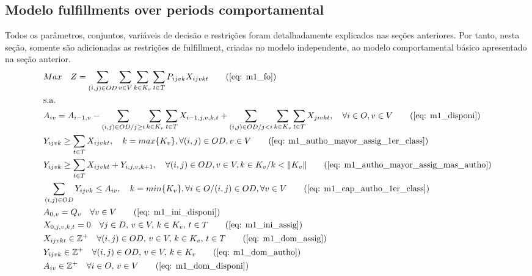\subsection{Modelo fulfillments over periods comportamental}
Todos os parâmetros, conjuntos, variáveis de decisão e restrições foram detalhadamente explicados nas seções anteriores. Por tanto, nesta seção, somente são adicionadas as restrições de fulfillment, criadas no modelo independente, ao modelo comportamental básico apresentado na seção anterior.
\allowdisplaybreaks
\begin{align}
	& Max \quad Z = \sum_{(i,j)\in OD} \sum_{v\in V} \sum_{k\in K_v} \sum_{t\in T} P_{ijvk} X_{ijvkt}     \tag{\ref{eq: m1_fo}}   \\
	& \text{s.a.}  \notag \\
	& A_{iv} = A_{i-1,v} - \sum_{(i,j) \in OD/j \geq i} \sum_{k\in K_v}\sum_{t\in T}X_{i-1,j,v,k,t} + \sum_{(i,j) \in OD/j<i} \sum_{k\in K_v}\sum_{t\in T}X_{jivkt}, \quad \forall i \in O, v \in V   \tag{\ref{eq: m1_disponi}} \\
	& Y_{ijvk} \geq  \sum_{t \in T} X_{ijvkt},  \quad k = max\{K_v\}, \forall(i,j) \in OD ,v \in V     \tag{\ref{eq: m1_autho_mayor_assig_1er_class}} \\
	& Y_{ijvk} \geq  \sum_{t \in T} X_{ijvkt} + Y_{i,j,v,k + 1} , \quad \forall(i,j) \in OD, v \in V, k \in K_v / k < \lVert K_v \rVert   \tag{\ref{eq: m1_autho_mayor_assig_mas_autho}} \\
	& \sum_{(i,j) \in OD} Y_{ijvk} \leq A_{iv}, \quad  k = min\{K_v\}, \forall i \in O / (i,j) \in OD,   \forall v \in V       \tag{\ref{eq: m1_cap_autho_1er_class}} \\
	& A_{0,v} = Q_v \quad \forall v \in V  \tag{\ref{eq: m1_ini_disponi}} \\ 
	& X_{0,j,v,k,t} = 0 \quad \forall j \in D,\, v \in V,\, k \in K_v,\, t \in T  \tag{\ref{eq: m1_ini_assig}} \\ 
	& X_{ijvkt} \in \mathbb{Z}^+ \quad \forall(i,j) \in OD,\, v \in V,\, k \in K_v,\, t \in T  \tag{\ref{eq: m1_dom_assig}} \\ 
	& Y_{ijvk} \in \mathbb{Z}^+ \quad \forall(i,j) \in OD,\, v \in V,\, k \in K_v  \tag{\ref{eq: m1_dom_autho}} \\ 
	& A_{iv} \in \mathbb{Z}^+ \quad \forall i \in O,\, v \in V  \tag{\ref{eq: m1_dom_disponi}} \\

\end{align}
